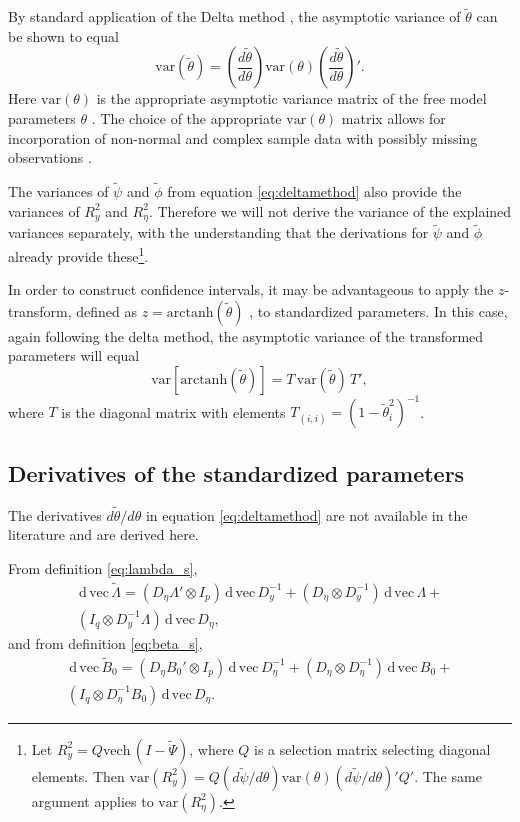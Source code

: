 \documentclass[a4paper,11pt]{article}
\newcommand{\n}{\eta}
\renewcommand{\d}{\,\mathrm{d}\,}
\newcommand{\kronprod}{\otimes}
\renewcommand{\vec}{\mathrm{vec}\,}
\newcommand{\vech}{\mathrm{vech}\,}
\newcommand{\Lambdastan}{\tilde{\Lambda}}
\newcommand{\Bstan}{\tilde{B}}
\newcommand{\thetastan}{\tilde{\theta}}
\newcommand{\0}{\boldsymbol{0}}
\newcommand{\var}{\mathrm{var}}
\newcommand{\arctanh}{\mathrm{arctanh}}
\begin{document}
By standard application of the Delta method \citep[e.g.][]{oehlert1992note}, the asymptotic variance of $\thetastan$ can be shown to equal
\begin{equation}\label{eq:deltamethod}
\var(\thetastan) = 
	\left(\frac{d \thetastan}{d \theta}\right) 
		\var(\theta) 
	\left(\frac{d \thetastan}{d \theta}\right)'.
\end{equation}
Here $\var(\theta)$ is the appropriate asymptotic variance matrix of the free model parameters $\theta$ \cite[e.g.][143-4]{satorra1989alternative}.
The choice of the appropriate $\var(\theta)$ matrix allows for incorporation of 
non-normal and complex sample data with possibly missing observations \citep{muthen1995complex}.

The variances of $\tilde\psi$ and $\tilde\phi$ from equation \ref{eq:deltamethod} also provide the 
variances of $R^2_y$ and $R^2_\n$. 
Therefore we will not derive the variance of the explained
variances separately, with the understanding that the derivations for $\tilde\psi$ and $\tilde\phi$ already provide these\footnote{
Let $R^2_y = Q \vech(I - \tilde\Psi)$, where $Q$ is a selection matrix 
selecting diagonal elements. Then $\var(R^2_y) = Q (d\tilde\psi/d\theta) \var(\theta) (d\tilde\psi/d\theta)' Q'$. The same
argument applies to $\var(R^2_\n)$.}.

In order to construct confidence intervals, it may be advantageous to apply the 
$z$-transform, defined as $z = \arctanh(\thetastan)$  \citep[section 35]{fisher1925statistical}, to standardized parameters.
In this case, again following the delta method, the asymptotic variance of the transformed parameters will equal
\begin{equation}\label{eq:deltamethod-ztransform}
\var[\arctanh(\thetastan)] = 
		T\,
		\var(\thetastan)\,
		T',
\end{equation}
where $T$ is the diagonal matrix with elements $T_{(i,i)} = (1 - \thetastan_i^2)^{-1}$.

\subsection{Derivatives of the standardized parameters}


The derivatives $d \thetastan / d \theta$ in equation \ref{eq:deltamethod} are not available in the literature and are derived here.

From definition \ref{eq:lambda_s}, 
\begin{multline}\label{eq:dveclam}
\d\vec\Lambdastan = 
    (D_\n \Lambda' \kronprod I_p) \d \vec D_y^{-1} + 
    (D_\n \kronprod D_y^{-1}) \d\vec\Lambda + \\
    (I_q \kronprod D_y^{-1} \Lambda) \d\vec D_\n,
\end{multline}
and from definition \ref{eq:beta_s}, 
\begin{multline}\label{eq:dvecbeta}
\d\vec \Bstan_0 = 
    (D_\n B_0' \kronprod I_p) \d \vec D_\n^{-1} + 
    (D_\n \kronprod D_\n^{-1}) \d\vec B_0 + \\
    (I_q \kronprod D_\n^{-1} B_0) \d\vec D_\n.
\end{multline}
\end{document}
